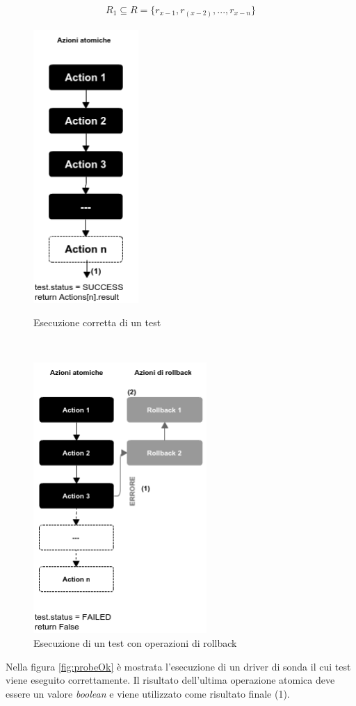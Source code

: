 \documentclass[../main.tex]{subfiles}
\begin{document}
\begin{align*}
R_1 \subseteq R =\{ r_{x-1}, r_(x-2), ... , r_{x-n}\}
\end{align*}
\begin{figure}[H]
 \begin{minipage}[b]{6cm}
   \centering
   \includegraphics[width=4cm]{immagini/FlowchartProbeOk.png}
   \caption{Esecuzione corretta di un test}\label{fig:probeOk}
 \end{minipage}
 \ \hspace{2mm} \hspace{3mm} \
 \begin{minipage}[b]{9cm}
  \centering
   \includegraphics[width=6.6cm]{immagini/FlowchartProbeRollback.png}
   \caption{Esecuzione di un test con operazioni di rollback}\label{fig:probeRb}
 \end{minipage}
\end{figure}
Nella figura \ref{fig:probeOk} è mostrata l'esecuzione di un driver di sonda il cui test viene eseguito correttamente.
Il risultato dell'ultima operazione atomica deve essere un valore \textit{boolean} e viene utilizzato come risultato finale (1).
\end{document}
